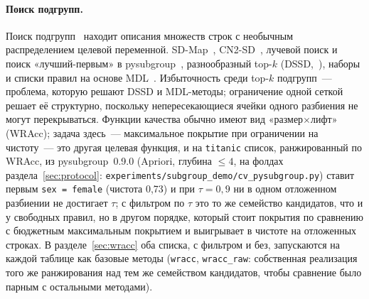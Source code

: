 \documentclass[11pt]{article}
\begin{document}
\paragraph{Поиск подгрупп.} Поиск подгрупп~\citep{klosgen1996,wrobel1997,herrera2011,atzmueller2015} находит описания множеств строк с необычным распределением целевой переменной. SD-Map~\citep{atzmueller2006}, CN2-SD~\citep{lavrac2004}, лучевой поиск и поиск «лучший-первым» в pysubgroup~\citep{lemmerich2018}, разнообразный top-$k$ (DSSD,~\citealp{vanleeuwen2012}), наборы и списки правил на основе MDL~\citep{fischer2019,proenca2022}. Избыточность среди top-$k$ подгрупп~--- проблема, которую решают DSSD и MDL-методы; ограничение одной сеткой решает её структурно, поскольку непересекающиеся ячейки одного разбиения не могут перекрываться. Функции качества обычно имеют вид «размер$\times$лифт» (WRAcc); задача здесь~--- максимальное покрытие при ограничении на чистоту~--- это другая целевая функция, и на \texttt{titanic} список, ранжированный по WRAcc, из pysubgroup~0.9.0 (Apriori, глубина $\le4$, на фолдах раздела~\ref{sec:protocol}: \texttt{experiments/subgroup\_demo/cv\_pysubgroup.py}) ставит первым \texttt{sex = female} (чистота 0,73) и при $\tau=0{,}9$ ни в одном отложенном разбиении не достигает $\tau$; с фильтром по $\tau$ это то же семейство кандидатов, что и у свободных правил, но в другом порядке, который стоит покрытия по сравнению с бюджетным максимальным покрытием и выигрывает в чистоте на отложенных строках. В разделе~\ref{sec:wracc} оба списка, с фильтром и без, запускаются на каждой таблице как базовые методы (\texttt{wracc}, \texttt{wracc\_raw}: собственная реализация того же ранжирования над тем же семейством кандидатов, чтобы сравнение было парным с остальными методами).
\end{document}
